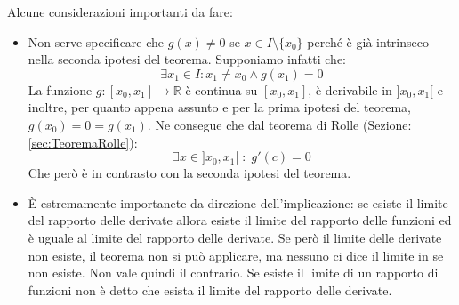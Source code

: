 Alcune considerazioni importanti da fare:
\begin{itemize}
	\item Non serve specificare che $g(x) \neq 0$ se $x \in I\setminus \{x_0\}$ perché è già intrinseco nella seconda ipotesi del teorema. Supponiamo infatti che:
		\begin{equation*}
			\exists x_1 \in I : x_1 \neq x_0 \land g(x_1) = 0
		\end{equation*}
		La funzione $g:[x_0, x_1] \to \mathbb{R}$ è continua su $[x_0, x_1]$, è derivabile in $]x_0,x_1[$ e inoltre, per quanto appena assunto e per la prima ipotesi del teorema, $g(x_0) = 0 = g(x_1)$. Ne consegue che dal teorema di Rolle (Sezione: \ref{sec:TeoremaRolle}):
		\begin{equation*}
			\exists x \in ]x_0, x_1[ \; : \; g'(c) = 0
		\end{equation*}
		Che però è in contrasto con la seconda ipotesi del teorema.

	\item È estremamente importanete da direzione dell'implicazione: se esiste il limite del rapporto delle derivate allora esiste il limite del rapporto delle funzioni ed è uguale al limite del rapporto delle derivate. Se però il limite delle derivate non esiste, il teorema non si può applicare, ma nessuno ci dice il limite in se non esiste. Non vale quindi il contrario. Se esiste il limite di un rapporto di funzioni non è detto che esista il limite del rapporto delle derivate. %
\end{itemize}

